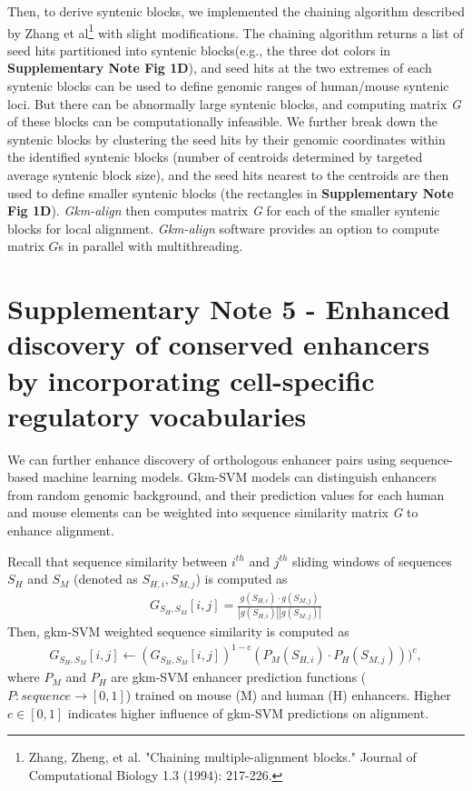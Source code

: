 \documentclass[english]{article}
\begin{document}
Then, to derive syntenic blocks, we implemented the chaining algorithm described by Zhang et al\footnote{Zhang, Zheng, et al. "Chaining multiple-alignment blocks." Journal of Computational Biology 1.3 (1994): 217-226.} with slight modifications. The chaining algorithm returns a list of seed hits partitioned into syntenic blocks(e.g., the three dot colors in \textbf{Supplementary Note Fig 1D}), and seed hits at the two extremes of each syntenic blocks can be used to define genomic ranges of human/mouse syntenic loci. But there can be abnormally large syntenic blocks, and computing matrix \textit{G} of these blocks can be computationally infeasible. We further break down the syntenic blocks by clustering the seed hits by their genomic coordinates within the identified syntenic blocks (number of centroids determined by targeted average syntenic block size), and the seed hits nearest to the centroids are then used to define smaller syntenic blocks (the rectangles in \textbf{Supplementary Note Fig 1D}). \textit{Gkm-align} then computes matrix \textit{G} for each of the smaller syntenic blocks for local alignment. \textit{Gkm-align} software provides an option to compute matrix $G$s in parallel with multithreading. 

\section{Supplementary Note 5 - Enhanced discovery of conserved enhancers by incorporating cell-specific regulatory vocabularies}

 We can further enhance discovery of orthologous enhancer pairs using sequence-based machine learning models. Gkm-SVM models can distinguish enhancers from random genomic background, and their prediction values for each human and mouse elements can be weighted into sequence similarity matrix \textit{G} to enhance alignment. 

 Recall that sequence similarity between $i^{th}$ and $j^{th}$ sliding windows of sequences $S_H$ and $S_M$ (denoted as $S_{H,i}, S_{M,j}$) is computed as 
\begin{align*}
    G_{S_H,S_M} [i,j] = \frac{g(S_{H,i}) \cdot g(S_{M,j})}{|g(S_{H,i})||g(S_{M,j})|}
\end{align*}
Then, gkm-SVM weighted sequence similarity is computed as 
\begin{align*}
    G_{S_H, S_M} [i,j] \leftarrow (G_{S_H, S_M}[i,j])^{1-c}(P_{M}(S_{H,i})\cdot P_{H}(S_{M,j})))^c,
\end{align*}
where $P_{M}$ and $P_{H}$ are  gkm-SVM enhancer prediction functions ($P: sequence \rightarrow [0,1]$) trained on mouse (M) and human (H) enhancers. Higher $c\in [0,1]$ indicates higher influence of gkm-SVM predictions on alignment. \\
\end{document}
